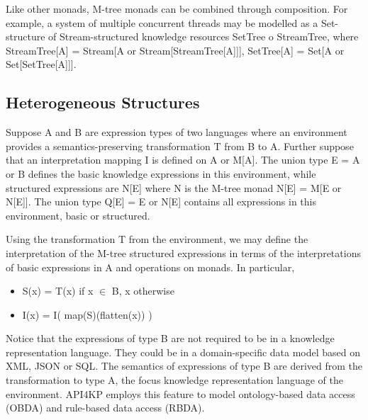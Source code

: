 \documentclass[runningheads]{llncs}
\begin{document}
Like other monads, M-tree monads can be combined through composition.
For example, a system of multiple concurrent threads may be modelled as a Set-structure of Stream-structured knowledge resources SetTree o StreamTree, where StreamTree[A] = Stream[A or Stream[StreamTree[A]]], SetTree[A] = Set[A or Set[SetTree[A]]].


\subsection{Heterogeneous Structures}
Suppose A and B are expression types of two languages where an environment provides a semantics-preserving transformation T from B to A.
Further suppose that an interpretation mapping I is defined on A or M[A].
The union type E = A or B defines the basic knowledge expressions in this environment, while structured expressions are N[E] where N is the M-tree monad  N[E] = M[E or N[E]].
The union type Q[E] = E or N[E] contains all expressions in this environment, basic or structured. 

Using the transformation T from the environment, we may define the interpretation of the M-tree structured expressions in terms of the interpretations of basic expressions in A and operations on monads. In particular,
\begin{itemize}
\item S(x) = T(x) if x $\in$ B, x otherwise
\item I(x) = I( map(S)(flatten(x)) )
\end{itemize}
Notice that the expressions of type B are not required to be in a knowledge representation language. They could be in a domain-specific data model based on XML, JSON or SQL. The semantics of expressions of type B are derived from the transformation to type A, the focus  knowledge representation language of the environment. API4KP employs this feature to model ontology-based data access (OBDA) and rule-based data access (RBDA).
\end{document}
